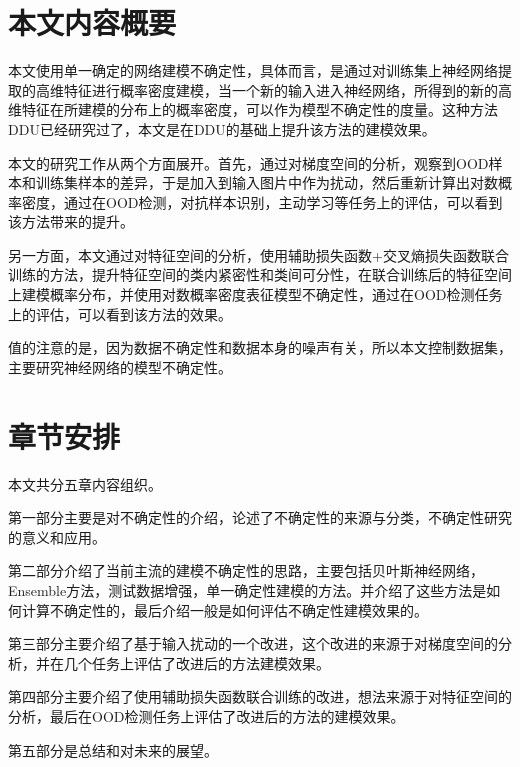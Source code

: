 \section{本文内容概要}
本文使用单一确定的网络建模不确定性，具体而言，是通过对训练集上神经网络提取的高维特征进行概率密度建模，当一个新的输入进入神经网络，所得到的新的高维特征在所建模的分布上的概率密度，可以作为模型不确定性的度量。这种方法DDU已经研究过了，本文是在DDU的基础上提升该方法的建模效果。

本文的研究工作从两个方面展开。首先，通过对梯度空间的分析，观察到OOD样本和训练集样本的差异，于是加入到输入图片中作为扰动，然后重新计算出对数概率密度，通过在OOD检测，对抗样本识别，主动学习等任务上的评估，可以看到该方法带来的提升。

另一方面，本文通过对特征空间的分析，使用辅助损失函数+交叉熵损失函数联合训练的方法，提升特征空间的类内紧密性和类间可分性，在联合训练后的特征空间上建模概率分布，并使用对数概率密度表征模型不确定性，通过在OOD检测任务上的评估，可以看到该方法的效果。

值的注意的是，因为数据不确定性和数据本身的噪声有关，所以本文控制数据集，主要研究神经网络的模型不确定性。
\section{章节安排}
本文共分五章内容组织。

第一部分主要是对不确定性的介绍，论述了不确定性的来源与分类，不确定性研究的意义和应用。

第二部分介绍了当前主流的建模不确定性的思路，主要包括贝叶斯神经网络，Ensemble方法，测试数据增强，单一确定性建模的方法。并介绍了这些方法是如何计算不确定性的，最后介绍一般是如何评估不确定性建模效果的。

第三部分主要介绍了基于输入扰动的一个改进，这个改进的来源于对梯度空间的分析，并在几个任务上评估了改进后的方法建模效果。

第四部分主要介绍了使用辅助损失函数联合训练的改进，想法来源于对特征空间的分析，最后在OOD检测任务上评估了改进后的方法的建模效果。

第五部分是总结和对未来的展望。
